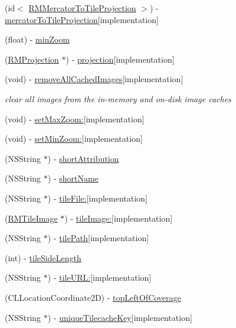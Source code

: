\begin{DoxyCompactItemize}
(id$<$ \hyperlink{protocol_r_m_mercator_to_tile_projection-p}{R\-M\-Mercator\-To\-Tile\-Projection} $>$) -\/ \hyperlink{interface_r_m_d_b_map_source_ab8dfcb15d311db4fdc18e19173f31498}{mercator\-To\-Tile\-Projection}{\ttfamily  \mbox{[}implementation\mbox{]}}
\item 
(float) -\/ \hyperlink{interface_r_m_d_b_map_source_a8859704fadf0331beff1cd972ce0cae2}{min\-Zoom}
\item 
(\hyperlink{interface_r_m_projection}{R\-M\-Projection} $\ast$) -\/ \hyperlink{interface_r_m_d_b_map_source_aa1d33d38c216b461ef99176340aa4f66}{projection}{\ttfamily  \mbox{[}implementation\mbox{]}}
\item 
(void) -\/ \hyperlink{interface_r_m_d_b_map_source_a07b71c53e4e77a0a5913a77b8b6aed50}{remove\-All\-Cached\-Images}{\ttfamily  \mbox{[}implementation\mbox{]}}
\begin{DoxyCompactList}\small\item\em clear all images from the in-\/memory and on-\/disk image caches \end{DoxyCompactList}\item 
(void) -\/ \hyperlink{interface_r_m_d_b_map_source_a8bd95b34c6d17e645d898909c26555ad}{set\-Max\-Zoom\-:}{\ttfamily  \mbox{[}implementation\mbox{]}}
\item 
(void) -\/ \hyperlink{interface_r_m_d_b_map_source_adb54ef89f88b7aa129425d8dd01d1385}{set\-Min\-Zoom\-:}{\ttfamily  \mbox{[}implementation\mbox{]}}
\item 
(N\-S\-String $\ast$) -\/ \hyperlink{interface_r_m_d_b_map_source_a5d75085589beaaa6e8f2958f8c377cee}{short\-Attribution}
\item 
(N\-S\-String $\ast$) -\/ \hyperlink{interface_r_m_d_b_map_source_ab03a73ee305bf795ffa0a67aa64b4045}{short\-Name}
\item 
(N\-S\-String $\ast$) -\/ \hyperlink{interface_r_m_d_b_map_source_aa0d4904556d8b307f231b56c9c1c118c}{tile\-File\-:}{\ttfamily  \mbox{[}implementation\mbox{]}}
\item 
(\hyperlink{interface_r_m_tile_image}{R\-M\-Tile\-Image} $\ast$) -\/ \hyperlink{interface_r_m_d_b_map_source_a4cc3a54e7e1500edfcee3c5718bf602d}{tile\-Image\-:}{\ttfamily  \mbox{[}implementation\mbox{]}}
\item 
(N\-S\-String $\ast$) -\/ \hyperlink{interface_r_m_d_b_map_source_a809d089522cbd82f816feb7684b36c50}{tile\-Path}{\ttfamily  \mbox{[}implementation\mbox{]}}
\item 
(int) -\/ \hyperlink{interface_r_m_d_b_map_source_a91adbde1feb5d85af5f83ba6d6c29e51}{tile\-Side\-Length}
\item 
(N\-S\-String $\ast$) -\/ \hyperlink{interface_r_m_d_b_map_source_ae7bd74552105cc01a806bf9c2e91e140}{tile\-U\-R\-L\-:}{\ttfamily  \mbox{[}implementation\mbox{]}}
\item 
(C\-L\-Location\-Coordinate2\-D) -\/ \hyperlink{interface_r_m_d_b_map_source_a997830d307f04c1fafa025f23d3401f6}{top\-Left\-Of\-Coverage}
\item 
(N\-S\-String $\ast$) -\/ \hyperlink{interface_r_m_d_b_map_source_a49c20adf6dafd4221bdc2ea1a93077e0}{unique\-Tilecache\-Key}{\ttfamily  \mbox{[}implementation\mbox{]}}
\end{DoxyCompactItemize}
